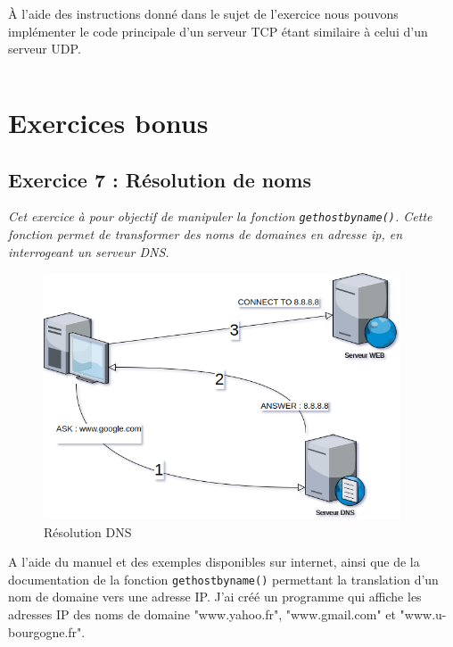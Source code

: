 À l'aide des instructions donné dans le sujet de l'exercice nous pouvons implémenter le code principale d'un serveur TCP étant similaire à celui d'un serveur UDP.

\inputminted[linenos,firstline=34, lastline=104]{cpp}{../sources/cpp/TP7-8/serveurTCP.c}

\section{Exercices bonus}

\subsection{Exercice 7 : Résolution de noms}
\textit{Cet exercice à pour objectif de manipuler la fonction \texttt{gethostbyname()}. Cette fonction permet de transformer des noms de domaines en adresse ip, en interrogeant un serveur DNS.}

\begin{figure}[H]
\centering
\includegraphics[width=300pt]{./cpp/Pictures/tp7+tp8-DNS}
\caption{Résolution DNS}
\label{Résolution DNS}
\end{figure}

A l’aide du manuel et des exemples disponibles sur internet, ainsi que de la documentation de la fonction \texttt{gethostbyname()} permettant la translation d’un nom de domaine vers une adresse IP. J'ai créé un programme qui affiche les adresses IP des noms de domaine "www.yahoo.fr", "www.gmail.com" et "www.u-bourgogne.fr".

\inputminted[linenos,firstline=10, lastline=36]{cpp}{../sources/cpp/TP7-8/getHostByName.c}

